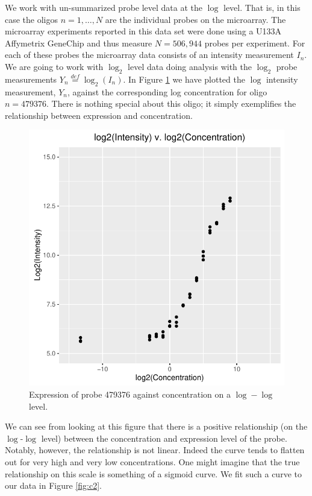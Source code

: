 \documentclass[reqno,12pt,oneside]{report}\usepackage[]{graphicx}\usepackage[]{color}
\makeatletter
\def\maxwidth{ %
  \ifdim\Gin@nat@width>\linewidth
    \linewidth
  \else
    \Gin@nat@width
  \fi
}
\newenvironment{knitrout}{}{} %
\renewenvironment{knitrout}{\begin{small}}{\end{small}}
\theoremstyle{plain}
\theoremstyle{definition}
\theoremstyle{remark}
\numberwithin{theorem}{chapter}     %
\makeatother
\begin{document}
We work with un-summarized probe level data at the $\log$ level. That is, in this case the oligos $n=1,\ldots,N$ are the individual probes on the microarray. The microarray experiments reported in this data set were done using a U133A Affymetrix GeneChip and thus measure $N=506,944$ probes per experiment. For each of these probes the microarray data consists of an intensity measurement $I_n$. We are going to work with $\log_2$ level data doing analysis with the $\log_2$ probe measurements $Y_n \overset{def}{=} \log_2(I_n)$. In Figure \ref{fig:c1} we have plotted the $\log$ intensity measurement, $Y_n$, against the corresponding log concentration for oligo $n=479376$. There is nothing special about this oligo; it simply exemplifies the relationship between expression and concentration. 

\begin{figure}[ht]
  \centering
\begin{knitrout}
\color{fgcolor}
\includegraphics[width=\maxwidth]{figure/chap4-fig1-1} 

\end{knitrout}
\caption{Expression of probe 479376 against concentration on a $\log-\log$ level.}
  \label{fig:c1}
\end{figure}

We can see from looking at this figure that there is a positive relationship (on the $\log$-$\log$ level) between the concentration and expression level of the probe. Notably, however, the relationship is not linear. Indeed the curve tends to flatten out for very high and very low concentrations. One might imagine that the true relationship on this scale is something of a sigmoid curve. We fit such a curve to our data in Figure \ref{fig:c2}.
\end{document}
